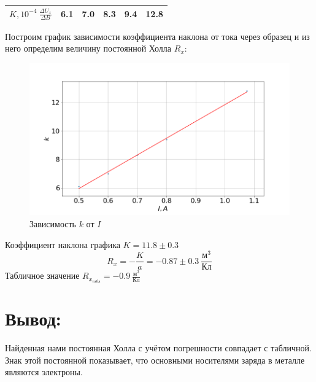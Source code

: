 \documentclass[a4paper, fontsize=14pt]{article}
\begin{document}
\begin{table}[H]

	\centering
	\begin{tabular}{|c|c|c|c|c|c|} \hline
		$K, 10^{-4}\ \frac{\Delta U_x}{\Delta B}$ & 6.1 & 7.0 & 8.3 & 9.4 & 12.8 \\\hline
	\end{tabular}	
\end{table}
Построим график зависимости коэффициента наклона от тока через образец и из него определим величину постоянной Холла $R_x$:
\begin{figure}[H]
\center
\includegraphics[scale=0.4]{3.png}
\caption{Зависимость $k$ от $I$}
\end{figure}
Коэффициент наклона графика $K = 11.8 \pm 0.3$
\[
	R_x = - \frac{K}{a} = -0.87 \pm 0.3\ \frac{\text{м}^3}{\text{Кл}}
\]
Табличное значение $R_{x_\text{табл}} = -0.9\ \frac{\text{м}^3}{\text{Кл}}$
\section*{Вывод:}
Найденная нами постоянная Холла с учётом погрешности совпадает с табличной. Знак этой постоянной показывает, что основными носителями заряда в металле являются электроны.
\end{document}

